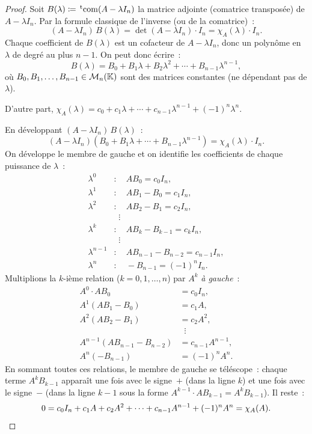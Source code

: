 \begin{proof}
  Soit $B(\lambda)\coloneqq\,^{\mathrm{t}}\!\operatorname{com}(A-\lambda I_n)$
  la matrice adjointe (comatrice transposée) de $A-\lambda I_n$.
  Par la formule classique de l'inverse (ou de la comatrice)~:
  \[
    (A-\lambda I_n)\,B(\lambda)=\det(A-\lambda I_n)\cdot I_n
    =\chi_A(\lambda)\cdot I_n.
  \]
  Chaque coefficient de $B(\lambda)$ est un cofacteur de $A-\lambda I_n$,
  donc un polynôme en $\lambda$ de degré au plus $n-1$. On peut donc
  écrire~:
  \[
    B(\lambda)=B_0+B_1\lambda+B_2\lambda^2+\cdots+B_{n-1}\lambda^{n-1},
  \]
  où $B_0,B_1,\ldots,B_{n-1}\in\mathcal{M}_n({\mathbb{K}})$ sont des matrices constantes
  (ne dépendant pas de $\lambda$).

  D'autre part, $\chi_A(\lambda)=c_0+c_1\lambda+\cdots+c_{n-1}\lambda^{n-1}
  +(-1)^n\lambda^n$.

  En développant $(A-\lambda I_n)\,B(\lambda)$~:
  \[
    (A-\lambda I_n)(B_0+B_1\lambda+\cdots+B_{n-1}\lambda^{n-1})
    =\chi_A(\lambda)\cdot I_n.
  \]
  On développe le membre de gauche et on identifie les coefficients de
  chaque puissance de $\lambda$~:
  \begin{align*}
    \lambda^0 &: \quad AB_0=c_0 I_n, \\
    \lambda^1 &: \quad AB_1-B_0=c_1 I_n, \\
    \lambda^2 &: \quad AB_2-B_1=c_2 I_n, \\
    &\;\;\vdots \\
    \lambda^{k} &: \quad AB_k-B_{k-1}=c_k I_n, \\
    &\;\;\vdots \\
    \lambda^{n-1} &: \quad AB_{n-1}-B_{n-2}=c_{n-1} I_n, \\
    \lambda^n &: \quad -B_{n-1}=(-1)^n I_n.
  \end{align*}
  Multiplions la $k$-ième relation ($k=0,1,\ldots,n$) par $A^k$
  \emph{à gauche}~:
  \begin{align*}
    A^0\cdot AB_0 &= c_0 I_n, \\
    A^1(AB_1-B_0) &= c_1 A, \\
    A^2(AB_2-B_1) &= c_2 A^2, \\
    &\;\;\vdots \\
    A^{n-1}(AB_{n-1}-B_{n-2}) &= c_{n-1}A^{n-1}, \\
    A^n(-B_{n-1}) &= (-1)^n A^n.
  \end{align*}
  En sommant toutes ces relations, le membre de gauche se téléscope~:
  chaque terme $A^k B_{k-1}$ apparaît une fois avec le signe~$+$ (dans
  la ligne $k$) et une fois avec le signe~$-$ (dans la ligne $k-1$
  sous la forme $A^{k-1}\cdot AB_{k-1}=A^k B_{k-1}$). Il reste~:
  \[
    0=c_0 I_n+c_1 A+c_2 A^2+\cdots+c_{n-1}A^{n-1}+(-1)^n A^n
    =\chi_A(A).
    \qedhere
  \]
\end{proof}

